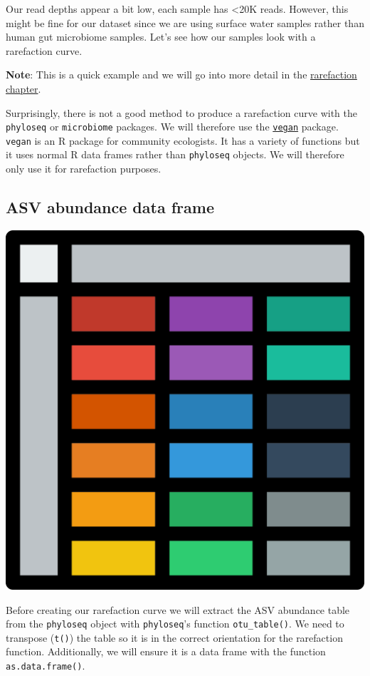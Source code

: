 \documentclass[
]{book}
\begin{document}
Our read depths appear a bit low, each sample has \textless20K reads.
However, this might be fine for our dataset since we are using surface water samples rather than human gut microbiome samples.
Let's see how our samples look with a rarefaction curve.

\textbf{Note}: This is a quick example and we will go into more detail in the \protect\hyperlink{rarefaction_chap}{rarefaction chapter}.

Surprisingly, there is not a good method to produce a rarefaction curve with the \texttt{phyloseq} or \texttt{microbiome} packages.
We will therefore use the \href{https://vegandevs.github.io/vegan/}{\texttt{vegan}} package.
\texttt{vegan} is an R package for community ecologists.
It has a variety of functions but it uses normal R data frames rather than \texttt{phyloseq} objects.
We will therefore only use it for rarefaction purposes.

\hypertarget{asv-abundance-data-frame}{%
\subsection{ASV abundance data frame}\label{asv-abundance-data-frame}}

\includegraphics{figures/nice_table.png}

Before creating our rarefaction curve we will extract the ASV abundance table from the \texttt{phyloseq} object with \texttt{phyloseq}'s function \texttt{otu\_table()}.
We need to transpose (\texttt{t()}) the table so it is in the correct orientation for the rarefaction function.
Additionally, we will ensure it is a data frame with the function \texttt{as.data.frame()}.
\end{document}
